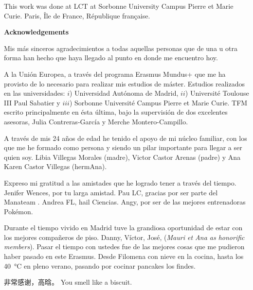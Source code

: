 \noindent
This work was done at LCT at Sorbonne University Campus Pierre et Marie Curie.
Paris, Île de France, République française.

\newpage
\thispagestyle{empty}

{\chancery

\textbf{\Huge{Acknowledgements}}

\vspace{1.5cm}

Mis más sinceros agradecimientos a todas aquellas personas que de una u otra
forma han hecho que haya llegado al punto en donde me encuentro hoy.

A la Unión Europea, a través del programa Erasmus Mundus+ que me ha provisto de
lo necesario para realizar mis estudios de máster. Estudios realizados en las
universidades: $i$) Universidad Autónoma de Madrid, $ii$) Université Toulouse
III Paul Sabatier y $iii$) Sorbonne Université Campus Pierre et Marie Curie.
TFM escrito principalmente en ésta última, bajo la supervisión de dos
excelentes asesoras, Julia Contreras-García y Merche Montero-Campillo.

A través de mis 24 años de edad he tenido el apoyo de mi núcleo familiar, con
los que me he formado como persona y siendo un pilar importante para llegar a
ser quien soy. Libia Villegas Morales (madre), Victor Castor Arenas (padre) y
Ana Karen Castor Villegas (hermAna).

Expreso mi gratitud a las amistades que he logrado tener a través del tiempo.
Jenifer Wences,
por tu larga amistad. 
Pau LC,
gracias por ser parte del Manateam .
Andrea FL, 
hail Ciencias.
Angy,
por ser de las mejores entrenadoras Pokémon.

Durante el tiempo vivido en Madrid tuve la grandiosa oportunidad de estar con
los mejores compañeros de piso. Danny, Víctor, José, (\textit{Mauri et Ana as
honorific members}). Pasar el tiempo con ustedes fue de las mejores cosas que
me pudieron haber pasado en este Erasmus. Desde Filomena con nieve en la
cocina, hasta los \SI{40}{\celsius} en pleno verano, pasando por cocinar
pancakes los findes.

\begin{CJK*}{UTF8}{gkai}
非常感谢，高晗。 You smell like a biscuit.
\end{CJK*} 

}

